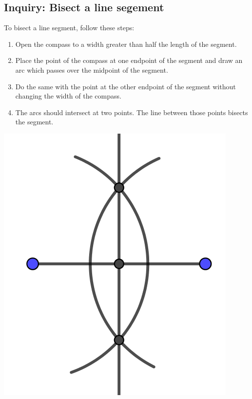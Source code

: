 \documentclass[11pt]{article}
\newenvironment{task}
	{\begin{mdframed}[linecolor=lightgray, linewidth=3pt]\raggedright}
	{\end{mdframed}}
\theoremstyle{definition}
\begin{document}
\subsection{Inquiry: Bisect a line segement}
\begin{task}
  To bisect a line segment, follow these steps:
  \begin{enumerate}
    \item Open the compass to a width greater than half the length of the segment.
    \item Place the point of the compass at one endpoint of the segment and draw an arc which passes over the midpoint of the segment.
    \item Do the same with the point at the other endpoint of the segment without changing the width of the compass.
    \item The arcs should intersect at two points. The line between those points bisects the segment. 
  \end{enumerate}
  \begin{center}
    \includegraphics[scale=.75]{Images/bisect_segment.png}
  \end{center}
\end{task}
\end{document}
